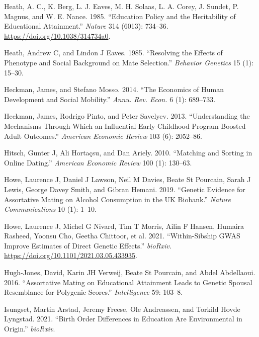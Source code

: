 \documentclass[
  12pt,
]{article}
\newlength{\cslhangindent}
\newlength{\cslentryspacingunit} %
\newenvironment{CSLReferences}[2] %
 {%
  \setlength{\parindent}{0pt}
  \ifodd #1
  \let\oldpar\par
  \def\par{\hangindent=\cslhangindent\oldpar}
  \fi
  \setlength{\parskip}{#2\cslentryspacingunit}
 }%
 {}
\theoremstyle{definition}
\theoremstyle{definition}
\theoremstyle{definition}
\theoremstyle{definition}
\theoremstyle{remark}
\begin{document}
\begin{CSLReferences}{1}{0}
\leavevmode{}%
Heath, A. C., K. Berg, L. J. Eaves, M. H. Solaas, L. A. Corey, J. Sundet, P. Magnus, and W. E. Nance. 1985. {``Education Policy and the Heritability of Educational Attainment.''} \emph{Nature} 314 (6013): 734--36. \url{https://doi.org/10.1038/314734a0}.

\leavevmode{}%
Heath, Andrew C, and Lindon J Eaves. 1985. {``Resolving the Effects of Phenotype and Social Background on Mate Selection.''} \emph{Behavior Genetics} 15 (1): 15--30.

\leavevmode{}%
Heckman, James, and Stefano Mosso. 2014. {``The Economics of Human Development and Social Mobility.''} \emph{Annu. Rev. Econ.} 6 (1): 689--733.

\leavevmode{}%
Heckman, James, Rodrigo Pinto, and Peter Savelyev. 2013. {``Understanding the Mechanisms Through Which an Influential Early Childhood Program Boosted Adult Outcomes.''} \emph{American Economic Review} 103 (6): 2052--86.

\leavevmode{}%
Hitsch, Gunter J, Ali Hortaçsu, and Dan Ariely. 2010. {``Matching and Sorting in Online Dating.''} \emph{American Economic Review} 100 (1): 130--63.

\leavevmode{}%
Howe, Laurence J, Daniel J Lawson, Neil M Davies, Beate St Pourcain, Sarah J Lewis, George Davey Smith, and Gibran Hemani. 2019. {``Genetic Evidence for Assortative Mating on Alcohol Consumption in the UK Biobank.''} \emph{Nature Communications} 10 (1): 1--10.

\leavevmode{}%
Howe, Laurence J, Michel G Nivard, Tim T Morris, Ailin F Hansen, Humaira Rasheed, Yoonsu Cho, Geetha Chittoor, et al. 2021. {``Within-Sibship GWAS Improve Estimates of Direct Genetic Effects.''} \emph{bioRxiv}. \url{https://doi.org/10.1101/2021.03.05.433935}.

\leavevmode{}%
Hugh-Jones, David, Karin JH Verweij, Beate St Pourcain, and Abdel Abdellaoui. 2016. {``Assortative Mating on Educational Attainment Leads to Genetic Spousal Resemblance for Polygenic Scores.''} \emph{Intelligence} 59: 103--8.

\leavevmode{}%
Isungset, Martin Arstad, Jeremy Freese, Ole Andreassen, and Torkild Hovde Lyngstad. 2021. {``Birth Order Differences in Education Are Environmental in Origin.''} \emph{bioRxiv}.


\end{CSLReferences}
\end{document}
